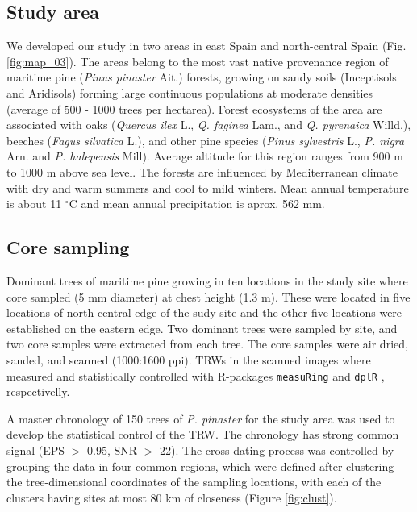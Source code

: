 \documentclass[review,authoryear]{elsarticle}
\begin{document}
\subsection{Study area}
We developed our study in two areas in east Spain and north-central
Spain (Fig. \ref{fig:map_03}). The areas belong to the most vast
native provenance region of maritime pine (\textit{Pinus pinaster}
Ait.) forests, growing on sandy soils (Inceptisols and Aridisols)
forming large continuous populations at moderate densities (average of
500 - 1000 trees per hectarea). Forest ecosystems of the area are
associated with oaks (\textit{Quercus ilex} L., \textit{Q. faginea}
Lam., and \textit{Q. pyrenaica} Willd.), beeches (\textit{Fagus
  silvatica} L.), and other pine species (\textit{Pinus sylvestris}
L., \textit{P. nigra} Arn. and \textit{P.  halepensis} Mill). Average
altitude for this region ranges from 900 m to 1000 m above sea
level. The forests are influenced by Mediterranean climate with dry
and warm summers and cool to mild winters. Mean annual temperature is
about 11 $^{\circ}$C and mean annual precipitation is aprox. 562 mm.

\subsection{Core sampling}
Dominant trees of maritime pine growing in ten locations in the study
site where core sampled (5 mm diameter) at chest height (1.3 m). These
were located in five locations of north-central edge of the sudy site
and the other five locations were established on the eastern edge. Two
dominant trees were sampled by site, and two core samples were
extracted from each tree. The core samples were air dried, sanded, and
scanned (1000:1600 ppi). \glspl{TRW} in the scanned images where
measured and statistically controlled with R-packages {\tt measuRing}
\citep{Lara2015} and {\tt dplR} \citep{Bunn2010}, respectivelly.

A master chronology of 150 trees of \textit{P. pinaster} for the study
area \citep{Bogino2008} was used to develop the statistical control of
the \gls{TRW}. The chronology has strong common signal (EPS $>$ 0.95,
SNR $>$ 22). The cross-dating process was controlled by grouping the
data in four common regions, which were defined after clustering the
tree-dimensional coordinates of the sampling locations, with each of
the clusters having sites at most 80 km of closeness (Figure
\ref{fig:clust}).
\end{document}
